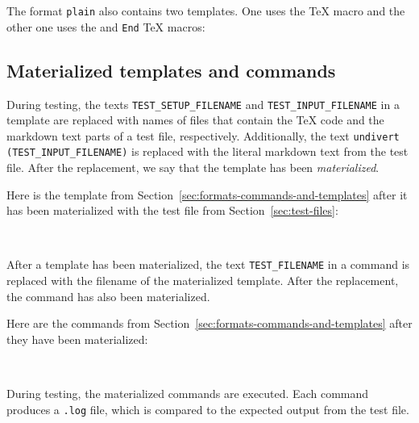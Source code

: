 \documentclass[final]{ltugboat}
\begin{document}
\smallskip
\noindent
The format \texttt{plain} also contains two templates. One uses the  \TeX{} macro and the other one uses the  and \texttt{End} \TeX{} macros:

\smallskip
\noindent
{}

\smallskip
\exampleSeparator

\smallskip
\noindent
{}

\subsection{Materialized templates and commands}
\label{sec:materialized-templates-and-commands}

During testing, the texts \texttt{TEST\_SETUP\_FILENAME} and \texttt{TEST\_INPUT\_FILENAME} in a template are replaced with names of files that contain the \TeX{} code and the markdown text parts of a test file, respectively. Additionally, the text \texttt{undivert (TEST\_INPUT\_FILENAME)} is replaced with the literal markdown text from the test file. After the replacement, we say that the template has been \emph{materialized}.

Here is the template  from Section~\ref{sec:formats-commands-and-templates} after it has been materialized with the test file  from Section~\ref{sec:test-files}:

\smallskip
\noindent
{} \\[0.4em]

\smallskip
\exampleSeparator

\smallskip
\noindent
{}

\smallskip

After a template has been materialized, the text \texttt{TEST\_FILENAME} in a command is replaced with the filename of the materialized template. After the replacement, the command has also been materialized.

Here are the commands  from Section~\ref{sec:formats-commands-and-templates} after they have been materialized:

\smallskip
\noindent
{} \\[0.8em]

\smallskip

\noindent
During testing, the materialized commands are executed. Each command produces a \texttt{.log} file, which is compared to the expected output from the test file.
\end{document}
